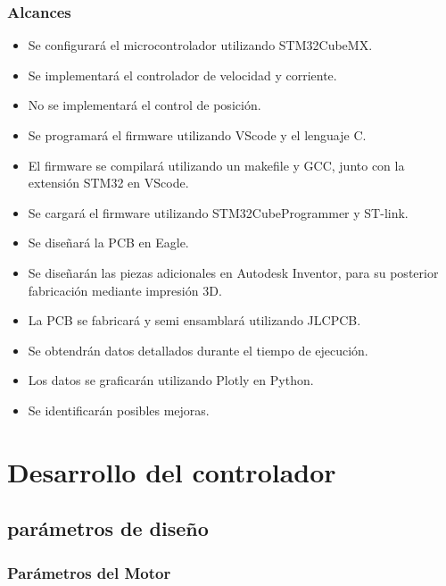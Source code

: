 \documentclass[11pt]{report}
\begin{document}
\subsection{Alcances}
\begin{itemize}
	\item Se configurará el microcontrolador utilizando STM32CubeMX.
	\item Se implementará el controlador de velocidad y corriente.
	\item No se implementará el control de posición.
	\item Se programará el firmware utilizando VScode y el lenguaje C.
	\item El firmware se compilará utilizando un makefile y GCC, junto con la extensión STM32 en VScode.
	\item Se cargará el firmware utilizando STM32CubeProgrammer y ST-link.
	\item Se diseñará la PCB en Eagle.
	\item Se diseñarán las piezas adicionales en Autodesk Inventor, para su posterior fabricación mediante impresión 3D.
	\item La PCB se fabricará y semi ensamblará utilizando JLCPCB.
	\item Se obtendrán datos detallados durante el tiempo de ejecución.
	\item Los datos se graficarán utilizando Plotly en Python.
	\item Se identificarán posibles mejoras.
\end{itemize}


\chapter{Desarrollo del controlador}
\section{parámetros de diseño}
\subsection{Parámetros del Motor}
\end{document}
